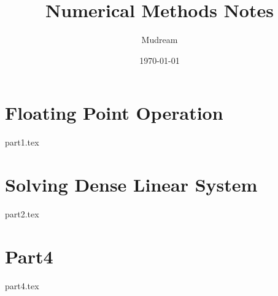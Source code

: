 \documentclass{article}
\title{Numerical Methods Notes}
\author{Mudream}
\date{\today}
\begin{document}
    \maketitle
    \part{Floating Point Operation}
    {part1.tex}
    \part{Solving Dense Linear System}
    {part2.tex}
    \part{Part4}
    {part4.tex}
\end{document}
